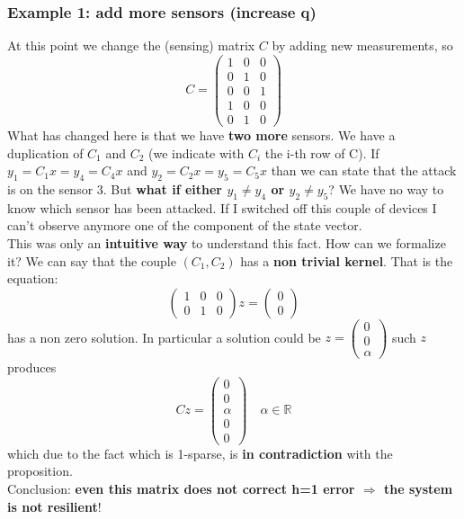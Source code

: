 {\color{orange}\subsubsection{Example 1: add more sensors (increase q)}}
At this point we change the (sensing) matrix $C$ by adding new measurements, so
$$C=\begin{pmatrix}
    1 &0 &0\\0& 1& 0\\0& 0 &1 \\ 1& 0& 0 \\ 0& 1& 0
\end{pmatrix}$$
What has changed here is that we have \textbf{two more }sensors. We have a duplication of $C_1$ and $C_2$ (we indicate with $C_i$ the i-th row of C). If $y_1=C_1x=y_4=C_4x$ and $y_2=C_2x=y_5=C_5x$ than we can state that the attack is on the sensor 3. But\textbf{ what if either $y_1 \ne y_4$ or $y_2 \ne y_5$}? We have no way to know which sensor has been attacked. If I switched off this couple of devices I can't observe anymore one of the component of the state vector. \\
This was only an \textbf{intuitive way} to understand this fact. How can we formalize it? 
We can say that the couple $(C_1, C_2)$ has a \textbf{non trivial kernel}. That is the equation:
$$\begin{pmatrix}
    1&0&0\\0&1&0
\end{pmatrix}z=\begin{pmatrix}
    0\\0
\end{pmatrix}$$
has a non zero solution. In particular a solution could be $z=\begin{pmatrix}
    0\\0\\\alpha
\end{pmatrix}$ such $z$ produces 
$$Cz=\begin{pmatrix}
    0\\0\\\alpha\\0\\0
\end{pmatrix} \quad \alpha \in \mathbb{R}$$ which due to the fact which is 1-sparse, is \textbf{in contradiction} with the proposition.\\
Conclusion: \textbf{even this matrix does not correct h=1 error $\Rightarrow$ the system \textbf{is not} resilient}!

